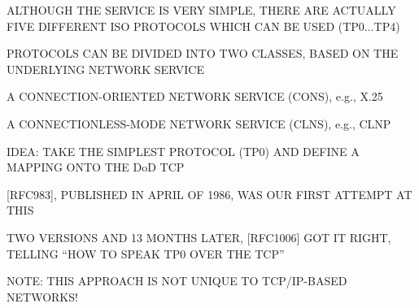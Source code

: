 

\begin{bwslide}

\begin{nrtc}
\item	ALTHOUGH THE SERVICE IS VERY SIMPLE, THERE ARE ACTUALLY FIVE DIFFERENT
	ISO PROTOCOLS WHICH CAN BE USED (TP0$\ldots$TP4)

\item	PROTOCOLS CAN BE DIVIDED INTO TWO CLASSES, BASED ON THE UNDERLYING
	NETWORK SERVICE
    \begin{nrtc}
    \item	A CONNECTION-ORIENTED NETWORK SERVICE (CONS), e.g., X.25
		

    \item	A CONNECTIONLESS-MODE NETWORK SERVICE (CLNS), e.g., CLNP
    \end{nrtc}
\end{nrtc}
\end{bwslide}


\begin{bwslide}

\begin{nrtc}
\item	IDEA: TAKE THE SIMPLEST PROTOCOL (TP0) AND DEFINE A MAPPING ONTO
	THE DoD TCP

\item{}	[RFC983], PUBLISHED IN APRIL OF 1986, WAS OUR FIRST ATTEMPT AT THIS

\item	TWO VERSIONS AND 13 MONTHS LATER, [RFC1006] GOT IT RIGHT, TELLING
	``HOW TO SPEAK TP0 OVER THE TCP''

\item	NOTE: THIS APPROACH IS NOT UNIQUE TO TCP/IP-BASED NETWORKS!
\end{nrtc}
\end{bwslide}




